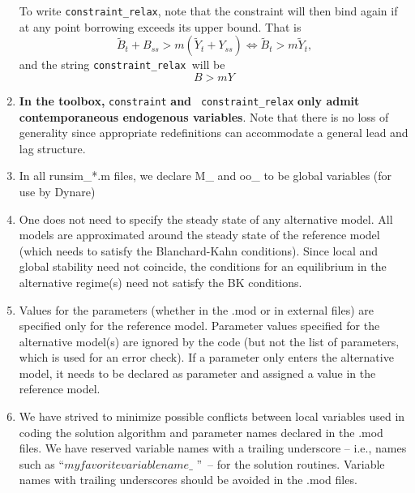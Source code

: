 \documentclass[12pt]{article}
\begin{document}
\begin{enumerate}
To write \texttt{constraint\_relax}, note that the constraint will then bind
again if at any point borrowing exceeds its upper bound. That is%
\begin{equation*}
\widetilde{B}_{t}+B_{ss}>m\left( \widetilde{Y}_{t}+Y_{ss}\right)
\Longleftrightarrow \widetilde{B}_{t}>m\widetilde{Y}_{t}\text{,}
\end{equation*}%
and the string \texttt{constraint\_relax }will be%
\begin{equation*}
B>mY
\end{equation*}

\item \textbf{In the toolbox,} \texttt{constraint} \textbf{and} \texttt{%
constraint\_relax} \textbf{only admit contemporaneous endogenous variables}.
Note that there is no loss of generality since appropriate redefinitions can
accommodate a general lead and lag structure.

\item In all runsim\_*.m files, we declare M\_ and oo\_ to be global
variables (for use by Dynare)

\item One does not need to specify the steady state of any alternative
model. All models are approximated around the steady state of the reference
model (which needs to satisfy the Blanchard-Kahn conditions). Since local
and global stability need not coincide, the conditions for an equilibrium in
the alternative regime(s) need not satisfy the BK conditions.

\item Values for the parameters (whether in the .mod or in external files)
are specified only for the reference model. Parameter values specified for
the alternative model(s) are ignored by the code (but not the list of
parameters, which is used for an error check). If a parameter only enters
the alternative model, it needs to be declared as parameter and assigned a
value in the reference model.

\item We have strived to minimize possible conflicts between local variables
used in coding the solution algorithm and parameter names declared in the
.mod files. We have reserved variable names with a trailing underscore --
i.e., names such as \textquotedblleft $myfavoritevariablename\_$%
\textquotedblright \ -- for the solution routines. Variable names with
trailing underscores should be avoided in the .mod files.
\end{enumerate}
\end{document}
